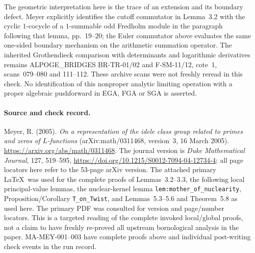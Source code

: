 The geometric interpretation here is the trace of an extension
and its boundary defect.  Meyer explicitly identifies the
cutoff commutator in Lemma~3.2 with the cyclic $1$-cocycle of
a $1$-summable odd Fredholm module in the paragraph following
that lemma, pp.~19--20; the Euler commutator above evaluates
the same one-sided boundary mechanism on the arithmetic
summation operator.  The inherited Grothendieck comparison
with determinants and logarithmic derivatives remains
ALPOGE\_BRIDGES BR-TR-01/02 and F-SM-11/12, cote~1,
scans~079--080 and 111--112.  These archive scans were not
freshly reread in this check.  No identification of this
nonproper analytic limiting operation with a proper algebraic
pushforward in EGA, FGA or SGA is asserted.

\paragraph{Source and check record.}
Meyer, R. (2005). \emph{On a representation of the idele class
group related to primes and zeros of $L$-functions}
(arXiv:math/0311468, version~3, 16 March 2005).
\url{https://arxiv.org/abs/math/0311468}.
The journal version is \emph{Duke Mathematical Journal},
127, 519--595, \url{https://doi.org/10.1215/S0012-7094-04-12734-4};
all page locators here refer to the 53-page arXiv version.
The attached primary \LaTeX\ was used for the complete proofs
of Lemmas~3.2--3.3, the following local principal-value lemmas,
the nuclear-kernel lemma \texttt{lem:mother\_of\_nuclearity},
Proposition/Corollary \texttt{T\_on\_Twist}, and
Lemmas~5.3--5.6 and Theorem~5.8 as used here.  The primary PDF
was consulted for version and page/number locators.  This is
a targeted reading of the complete invoked local/global
proofs, not a claim to have freshly re-proved all upstream
bornological analysis in the paper.  MA-MEY-001--003 have
complete proofs above and individual post-writing check
events in the run record.
